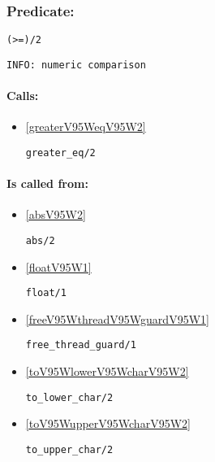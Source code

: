 \subsubsection{Predicate:} \label{V62WV61WV95W2}

\begin{verbatim}
(>=)/2
\end{verbatim}

{\small \begin{verbatim}
INFO: numeric comparison

\end{verbatim}}
\paragraph{Calls:} 
\begin{itemize}
\item \ref{greaterV95WeqV95W2} 
\begin{verbatim}
greater_eq/2
\end{verbatim}

\end{itemize}
\paragraph{Is called from:} 
\begin{itemize}
\item \ref{absV95W2} 
\begin{verbatim}
abs/2
\end{verbatim}

\item \ref{floatV95W1} 
\begin{verbatim}
float/1
\end{verbatim}

\item \ref{freeV95WthreadV95WguardV95W1} 
\begin{verbatim}
free_thread_guard/1
\end{verbatim}

\item \ref{toV95WlowerV95WcharV95W2} 
\begin{verbatim}
to_lower_char/2
\end{verbatim}

\item \ref{toV95WupperV95WcharV95W2} 
\begin{verbatim}
to_upper_char/2
\end{verbatim}

\end{itemize}

